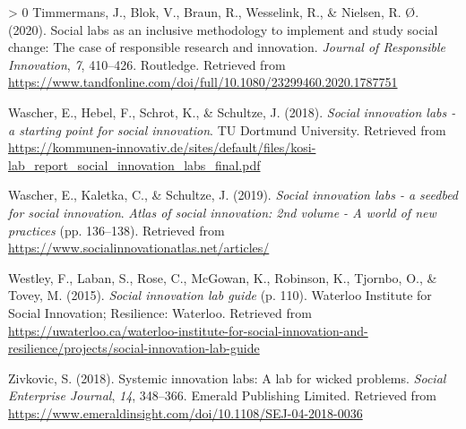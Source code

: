 \documentclass[]{elsarticle} %
\newlength{\cslhangindent}
\newenvironment{CSLReferences}[3] %
 {%
  \setlength{\parindent}{0pt}
  \ifodd #1 \everypar{\setlength{\hangindent}{\cslhangindent}}\ignorespaces\fi
  \ifnum #2 > 0
  \setlength{\parskip}{#2\baselineskip}
  \fi
 }%
 {}
\begin{document}
\begin{CSLReferences}{1}{0}
\leavevmode\hypertarget{ref-Timmermans2020}{}%
Timmermans, J., Blok, V., Braun, R., Wesselink, R., \& Nielsen, R. Ø.
(2020). Social labs as an inclusive methodology to implement and study
social change: The case of responsible research and innovation.
\emph{Journal of Responsible Innovation}, \emph{7}, 410--426. Routledge.
Retrieved from
\url{https://www.tandfonline.com/doi/full/10.1080/23299460.2020.1787751}

\leavevmode\hypertarget{ref-Wascher2018}{}%
Wascher, E., Hebel, F., Schrot, K., \& Schultze, J. (2018). \emph{Social
innovation labs - a starting point for social innovation}. TU Dortmund
University. Retrieved from
\url{https://kommunen-innovativ.de/sites/default/files/kosi-lab_report_social_innovation_labs_final.pdf}

\leavevmode\hypertarget{ref-Wascher2019}{}%
Wascher, E., Kaletka, C., \& Schultze, J. (2019). \emph{Social
innovation labs - a seedbed for social innovation}. \emph{Atlas of
social innovation: 2nd volume - A world of new practices} (pp.
136--138). Retrieved from
\url{https://www.socialinnovationatlas.net/articles/}

\leavevmode\hypertarget{ref-Westley2015}{}%
Westley, F., Laban, S., Rose, C., McGowan, K., Robinson, K., Tjornbo,
O., \& Tovey, M. (2015). \emph{Social innovation lab guide} (p. 110).
Waterloo Institute for Social Innovation; Resilience: Waterloo.
Retrieved from
\url{https://uwaterloo.ca/waterloo-institute-for-social-innovation-and-resilience/projects/social-innovation-lab-guide}

\leavevmode\hypertarget{ref-Zivkovic2018}{}%
Zivkovic, S. (2018). Systemic innovation labs: A lab for wicked
problems. \emph{Social Enterprise Journal}, \emph{14}, 348--366. Emerald
Publishing Limited. Retrieved from
\url{https://www.emeraldinsight.com/doi/10.1108/SEJ-04-2018-0036}

\end{CSLReferences}
\end{document}
